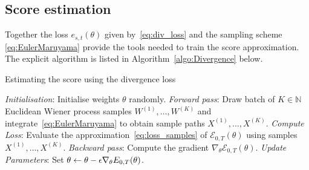 \documentclass[10pt]{amsart}
\theoremstyle{remark}
\newcommand{\scrE}{\mathscr{E}}
\newcommand{\R}{\mathbb{R}}
\numberwithin{equation}{section}
\begin{document}
\subsection{Score estimation}
Together the loss $e_{s,t}(\theta)$ given by~\eqref{eq:div_loss} and the sampling scheme \eqref{eq:EulerMaruyama} provide the tools needed to train the score approximation. The explicit algorithm is listed in Algorithm~\ref{algo:Divergence} below.
\begin{algorithm}[H] 
\caption{Estimating the score using the divergence loss}
\label{algo:Divergence}
\begin{algorithmic}[1]
\State \textit{Initialisation}: Initialise weights $\theta$ randomly.
    \State \textit{Forward pass}: Draw batch of $K\in\mathbb N$ Euclidean Wiener process samples $W^{(1)},\dots,W^{(K)}$ and integrate~\eqref{eq:EulerMaruyama} to obtain sample paths $X^{(1)},\dots,X^{(K)}$.
    \State \textit{Compute Loss}: Evaluate the approximation~\eqref{eq:loss_samples} of $\scrE_{0,T}(\theta)$ using samples $X^{(1)},\dots,X^{(K)}$.
    \State \textit{Backward pass}: Compute the gradient $\nabla_\theta\scrE_{0,T}(\theta)$.
    \State \textit{Update Parameters}: Set $\theta\leftarrow \theta-\epsilon\nabla_\theta\mathcal \scrE_{0,T}(\theta)$.
\EndFor
\end{algorithmic}
\end{algorithm}
\end{document}
